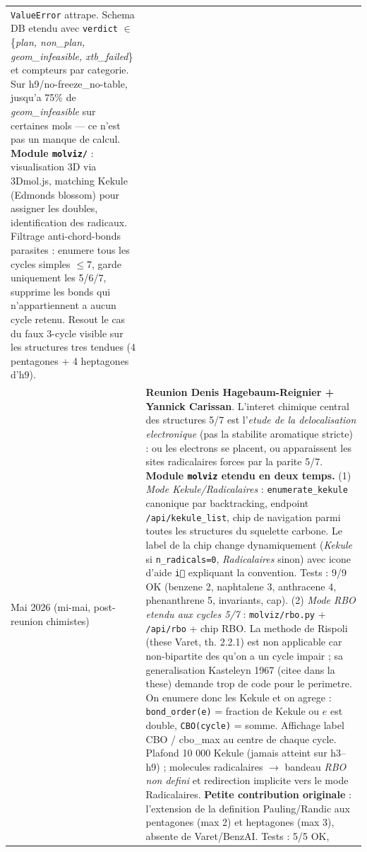 \begin{center}
\begin{tabular}{lp{11cm}}
    \texttt{ValueError} attrape. Schema DB etendu avec \texttt{verdict}
    $\in$ \{\emph{plan, non\_plan, geom\_infeasible, xtb\_failed}\} et compteurs
    par categorie. Sur h9/no-freeze\_no-table, jusqu'a 75\% de
    \emph{geom\_infeasible} sur certaines mols --- ce n'est pas un manque de
    calcul. \textbf{Module \texttt{molviz/}} : visualisation 3D via 3Dmol.js,
    matching Kekule (Edmonds blossom) pour assigner les doubles, identification
    des radicaux. Filtrage anti-chord-bonds parasites : enumere tous les
    cycles simples $\leq 7$, garde uniquement les 5/6/7, supprime les bonds
    qui n'appartiennent a aucun cycle retenu. Resout le cas du faux 3-cycle
    visible sur les structures tres tendues (4 pentagones + 4 heptagones d'h9). \\
  Mai 2026 (mi-mai, post-reunion chimistes) &
    \textbf{Reunion Denis Hagebaum-Reignier + Yannick Carissan}. L'interet
    chimique central des structures 5/7 est l'\emph{etude de la
    delocalisation electronique} (pas la stabilite aromatique stricte) :
    ou les electrons se placent, ou apparaissent les sites radicalaires
    forces par la parite 5/7. \textbf{Module \texttt{molviz} etendu en
    deux temps.} (1) \emph{Mode Kekule/Radicalaires} :
    \texttt{enumerate\_kekule} canonique par backtracking, endpoint
    \texttt{/api/kekule\_list}, chip de navigation parmi toutes les
    structures du squelette carbone. Le label de la chip change
    dynamiquement (\emph{Kekule} si \texttt{n\_radicals=0},
    \emph{Radicalaires} sinon) avec icone d'aide \texttt{\textcircled{i}}
    expliquant la convention. Tests : 9/9 OK (benzene 2, naphtalene 3,
    anthracene 4, phenanthrene 5, invariants, cap). (2) \emph{Mode RBO}
    \emph{etendu aux cycles 5/7} : \texttt{molviz/rbo.py} +
    \texttt{/api/rbo} + chip RBO. La methode de Rispoli (these Varet,
    th. 2.2.1) est non applicable car non-bipartite des qu'on a un cycle
    impair ; sa generalisation Kasteleyn 1967 (citee dans la these)
    demande trop de code pour le perimetre. On enumere donc les Kekule
    et on agrege : \texttt{bond\_order(e)} = fraction de Kekule ou
    \(e\) est double, \texttt{CBO(cycle)} = somme. Affichage label
    \og{}CBO / cbo\_max\fg{} au centre de chaque cycle. Plafond 10 000
    Kekule (jamais atteint sur h3--h9) ; molecules radicalaires
    $\to$ bandeau \emph{RBO non defini} et redirection implicite vers
    le mode Radicalaires. \textbf{Petite contribution originale} :
    l'extension de la definition Pauling/Randic aux pentagones (max 2)
    et heptagones (max 3), absente de Varet/BenzAI. Tests : 5/5 OK,

\end{tabular}
\end{center}
